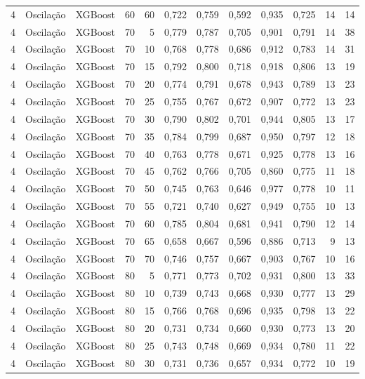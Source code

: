 \begin{longtable}{@{}rllrrrrrrrrr@{}}
4 & Oscilação & XGBoost & 60 & 60 & 0,722 & 0,759 & 0,592 & 0,935 & 0,725 & 14 & 14 \\
4 & Oscilação & XGBoost & 70 & 5 & 0,779 & 0,787 & 0,705 & 0,901 & 0,791 & 14 & 38 \\
4 & Oscilação & XGBoost & 70 & 10 & 0,768 & 0,778 & 0,686 & 0,912 & 0,783 & 14 & 31 \\
4 & Oscilação & XGBoost & 70 & 15 & 0,792 & 0,800 & 0,718 & 0,918 & 0,806 & 13 & 19 \\
4 & Oscilação & XGBoost & 70 & 20 & 0,774 & 0,791 & 0,678 & 0,943 & 0,789 & 13 & 23 \\
4 & Oscilação & XGBoost & 70 & 25 & 0,755 & 0,767 & 0,672 & 0,907 & 0,772 & 13 & 23 \\
4 & Oscilação & XGBoost & 70 & 30 & 0,790 & 0,802 & 0,701 & 0,944 & 0,805 & 13 & 17 \\
4 & Oscilação & XGBoost & 70 & 35 & 0,784 & 0,799 & 0,687 & 0,950 & 0,797 & 12 & 18 \\
4 & Oscilação & XGBoost & 70 & 40 & 0,763 & 0,778 & 0,671 & 0,925 & 0,778 & 13 & 16 \\
4 & Oscilação & XGBoost & 70 & 45 & 0,762 & 0,766 & 0,705 & 0,860 & 0,775 & 11 & 18 \\
4 & Oscilação & XGBoost & 70 & 50 & 0,745 & 0,763 & 0,646 & 0,977 & 0,778 & 10 & 11 \\
4 & Oscilação & XGBoost & 70 & 55 & 0,721 & 0,740 & 0,627 & 0,949 & 0,755 & 10 & 13 \\
4 & Oscilação & XGBoost & 70 & 60 & 0,785 & 0,804 & 0,681 & 0,941 & 0,790 & 12 & 14 \\
4 & Oscilação & XGBoost & 70 & 65 & 0,658 & 0,667 & 0,596 & 0,886 & 0,713 & 9 & 13 \\
4 & Oscilação & XGBoost & 70 & 70 & 0,746 & 0,757 & 0,667 & 0,903 & 0,767 & 10 & 16 \\
4 & Oscilação & XGBoost & 80 & 5 & 0,771 & 0,773 & 0,702 & 0,931 & 0,800 & 13 & 33 \\
4 & Oscilação & XGBoost & 80 & 10 & 0,739 & 0,743 & 0,668 & 0,930 & 0,777 & 13 & 29 \\
4 & Oscilação & XGBoost & 80 & 15 & 0,766 & 0,768 & 0,696 & 0,935 & 0,798 & 13 & 22 \\
4 & Oscilação & XGBoost & 80 & 20 & 0,731 & 0,734 & 0,660 & 0,930 & 0,773 & 13 & 20 \\
4 & Oscilação & XGBoost & 80 & 25 & 0,743 & 0,748 & 0,669 & 0,934 & 0,780 & 11 & 22 \\
4 & Oscilação & XGBoost & 80 & 30 & 0,731 & 0,736 & 0,657 & 0,934 & 0,772 & 10 & 19 \\

\end{longtable}
